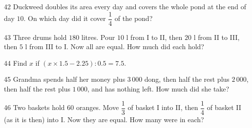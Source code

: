 \gap
\begin{probbox}{42}{}
Duckweed doubles its area every day and covers the whole pond at the end of day $10$. On which day did it cover $\dfrac14$ of the pond?
\end{probbox}
\gap
\begin{probbox}{43}{}
Three drums hold $180$ litres. Pour $10$ l from I to II, then $20$ l from II to III, then $5$ l from III to I. Now all are equal. How much did each hold?
\end{probbox}
\gap
\begin{probbox}{44}{}
Find $x$ if $(x\times1.5-2.25):0.5=7.5$.
\end{probbox}
\gap
\begin{probbox}{45}{}
Grandma spends half her money plus $3\,000$ dong, then half the rest plus $2\,000$, then half the rest plus $1\,000$, and has nothing left. How much did she take?
\end{probbox}
\gap
\begin{probbox}{46}{}
Two baskets hold $60$ oranges. Move $\dfrac13$ of basket I into II, then $\dfrac14$ of basket II (as it is then) into I. Now they are equal. How many were in each?
\end{probbox}
